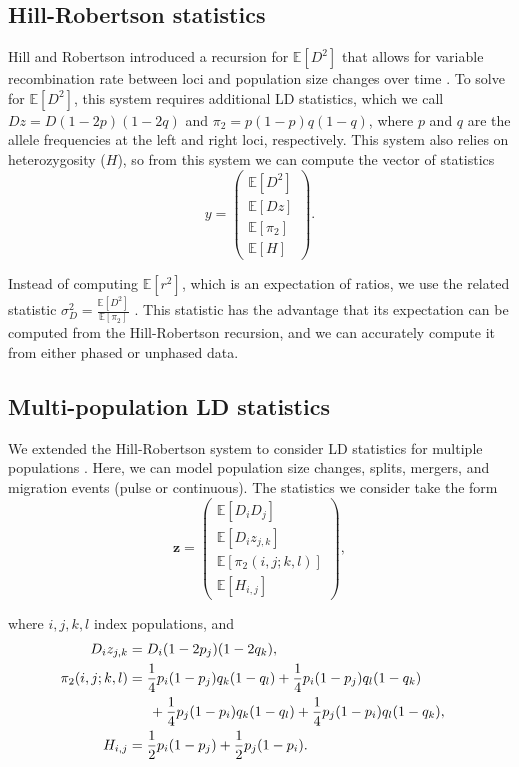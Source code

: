 \documentclass[10pt]{article}
\renewcommand{\cite}{\citep}
\newcommand{\E}{\mathbb{E}}
\begin{document}
\subsection{Hill-Robertson statistics}

Hill and Robertson introduced a recursion for $\E[D^2]$ that allows for variable recombination rate between loci and population size changes over time \cite{Hill1968}.
To solve for $\E[D^2]$, this system requires additional LD statistics, which we call $Dz = D(1-2p)(1-2q)$ and $\pi_2 = p(1-p)q(1-q)$, where $p$ and $q$ are the allele frequencies at the left and right loci, respectively.
This system also relies on heterozygosity ($H$), so from this system we can compute the vector of statistics
$$y=\begin{pmatrix} \E[D^2] \\ \E[Dz] \\ \E[\pi_2] \\ \E[H] \end{pmatrix}.$$

Instead of computing $\E[r^2]$, which is an expectation of ratios, we use the related statistic $\sigma_D^2 = \frac{\E[D^2]}{\E[\pi_2]}$ \cite{Hill1968,Ohta1971}.
This statistic has the advantage that its expectation can be computed from the Hill-Robertson recursion, and we can accurately compute it from either phased or unphased data.

\subsection{Multi-population LD statistics}

We extended the Hill-Robertson system to consider LD statistics for multiple populations \cite{Ragsdale2018}.
Here, we can model population size changes, splits, mergers, and migration events (pulse or continuous).
The statistics we consider take the form
$$
\mathbf{z} = \begin{pmatrix} 
\E[D_i D_j] \\
\E[D_i z_{j,k}] \\
\E[{\pi_2}(i,j;k,l)] \\
\E[H_{i,j}]
\end{pmatrix},
$$

where $i,j,k,l$ index populations, and
\begin{align*}
 D_iz_{j,k} & = D_i (1-2p_j)(1-2q_k), \\
 {\pi_2}(i,j;k,l) & = \frac{1}{4} p_i(1-p_j) q_k(1-q_l) + \frac{1}{4} p_i(1-p_j) q_l(1-q_k) & \\
					&\hspace{15 pt} + \frac{1}{4} p_j(1-p_i) q_k(1-q_l) + \frac{1}{4} p_j(1-p_i) q_l(1-q_k) , \\
 H_{i,j} & =\frac{1}{2}p_i(1-p_j) + \frac{1}{2}p_j(1-p_i).
\end{align*}
\end{document}
